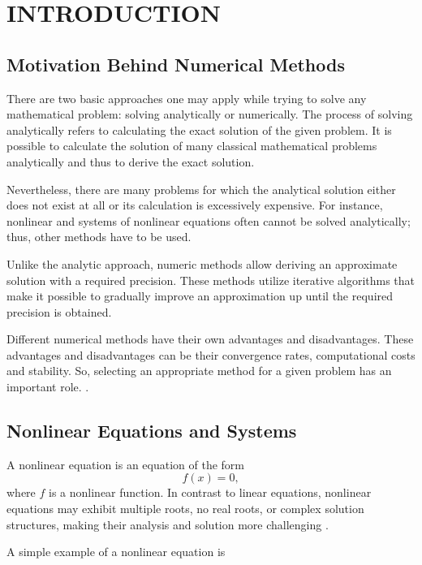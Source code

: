 \chapter{\MakeUppercase{Introduction}}

\section{Motivation Behind Numerical Methods}

There are two basic approaches one may apply while trying to solve any mathematical problem: solving analytically or numerically. The process of solving analytically refers to calculating the exact solution of the given problem. It is possible to calculate the solution of many classical mathematical problems analytically and thus to derive the exact solution.

Nevertheless, there are many problems for which the analytical solution either does not exist at all or its calculation is excessively expensive. For instance, nonlinear and systems of nonlinear equations often cannot be solved analytically; thus, other methods have to be used.

Unlike the analytic approach, numeric methods allow deriving an approximate solution with a required precision. These methods utilize iterative algorithms that make it possible to gradually improve an approximation up until the required precision is obtained.

Different numerical methods have their own advantages and disadvantages. These advantages and disadvantages can be their convergence rates, computational costs and stability. So, selecting an appropriate method for a given problem has an important role. \cite{burden, atkinson}.

\section{Nonlinear Equations and Systems}

A nonlinear equation is an equation of the form
\begin{equation}
f(x) = 0,
\end{equation}
\noindent where \( f \) is a nonlinear function. In contrast to linear equations, nonlinear equations may exhibit multiple roots, no real roots, or complex solution structures, making their analysis and solution more challenging \cite{burden, atkinson}.

A simple example of a nonlinear equation is

